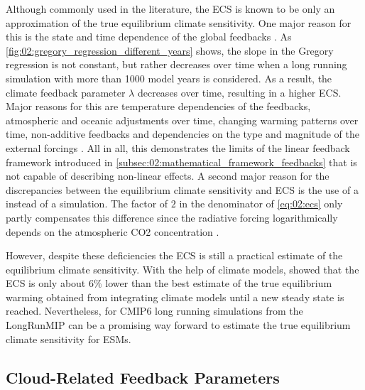 Although commonly used in the literature, the \ac{ECS} is known to be only an
approximation of the true equilibrium climate sensitivity. One major reason for
this is the state and time dependence of the global feedbacks
\autocite{Knutti2015, Knutti2017}. As
\cref{fig:02:gregory_regression_different_years} shows, the slope in the
Gregory regression is not constant, but rather decreases over time when a long
running  simulation with more than 1000 model years is considered.
As a result, the climate feedback parameter $\lambda$ decreases over time,
resulting in a higher \ac{ECS}. Major reasons for this are temperature
dependencies of the feedbacks, atmospheric and oceanic adjustments over time,
changing warming patterns over time, non-additive feedbacks and dependencies on
the type and magnitude of the external forcings \autocite{Knutti2017}. All in
all, this demonstrates the limits of the linear feedback framework introduced
in \cref{subsec:02:mathematical_framework_feedbacks} that is not capable of
describing non-linear effects. A second major reason for the discrepancies
between the equilibrium climate sensitivity and \ac{ECS} is the use of a
 instead of a  simulation. The factor of $2$ in the
denominator of \cref{eq:02:ecs} only partly compensates this difference since
the radiative forcing logarithmically depends on the atmospheric \ac{CO2}
concentration \autocite{Huang2014}.

However, despite these deficiencies the \ac{ECS} is still a practical estimate
of the equilibrium climate sensitivity. With the help of climate models,
\textcite{Sherwood2020} showed that the \ac{ECS} is only about $6 \unit{\%}$
lower than the best estimate of the true equilibrium warming obtained from
integrating climate models until a new steady state is reached. Nevertheless,
for \acs{CMIP}6 long running simulations from the \ac{LongRunMIP}
\autocite{Rugenstein2019} can be a promising way forward to estimate the true
equilibrium climate sensitivity for \acp{ESM}.


\subsection{Cloud-Related Feedback Parameters}
\label{subsec:02:cloud_feedback_parameters}

